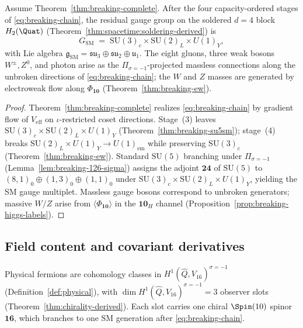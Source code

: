 \begin{proposition}
\label{prop:sm-gauge-content}
Assume Theorem~\ref{thm:breaking-complete}. After the four capacity-ordered
stages of \eqref{eq:breaking-chain}, the residual gauge group on the
soldered $d=4$ block $H_2(\Quat)$ (Theorem~\ref{thm:spacetime:soldering-derived})
is
\begin{equation}\label{eq:sm-gauge-group}
  G_{\mathrm{SM}}
  \;=\;
  \mathrm{SU}(3)_c\times\mathrm{SU}(2)_L\times U(1)_Y,
\end{equation}
with Lie algebra $\mathfrak{g}_{\mathrm{SM}}=\mathfrak{su}_3\oplus\mathfrak{su}_2
\oplus\mathfrak{u}_1$. The eight gluons, three weak bosons
$W^\pm,Z^0$, and photon arise as the $\Pi_{\sigma=-1}$-projected massless
connections along the unbroken directions of \eqref{eq:breaking-chain}; the
$W$ and $Z$ masses are generated by electroweak flow along $\Phi_{\mathbf{10}}$
(Theorem~\ref{thm:breaking-ew}).
\end{proposition}

\begin{proof}
Theorem~\ref{thm:breaking-complete} realizes
\eqref{eq:breaking-chain} by gradient flow of $V_{\mathrm{eff}}$ on
$\iota$-restricted coset directions. Stage~(3) leaves
$\mathrm{SU}(3)_c\times\mathrm{SU}(2)_L\times U(1)_Y$
(Theorem~\ref{thm:breaking-su5sm}); stage~(4) breaks
$\mathrm{SU}(2)_L\times U(1)_Y\to U(1)_{\mathrm{em}}$ while preserving
$\mathrm{SU}(3)_c$ (Theorem~\ref{thm:breaking-ew}). Standard $\mathrm{SU}(5)$
branching under $\Pi_{\sigma=-1}$ (Lemma~\ref{lem:breaking-126-sigma})
assigns the adjoint $\mathbf{24}$ of $\mathrm{SU}(5)$ to
$(8,1)_0\oplus(1,3)_0\oplus(1,1)_0$ under
$\mathrm{SU}(3)_c\times\mathrm{SU}(2)_L\times U(1)_Y$, yielding the SM gauge
multiplet. Massless gauge bosons correspond to unbroken generators; massive
$W/Z$ arise from $\langle\Phi_{\mathbf{10}}\rangle$ in the $\mathbf{10}_H$
channel (Proposition~\ref{prop:breaking-higgs-labels}).
\end{proof}

\subsection{Field content and covariant derivatives}
\label{sec:sm-lagrangian:fields}

Physical fermions are cohomology classes in
$H^1(\hat Q,V_{16})^{\sigma=-1}$ (Definition~\ref{def:physical}), with
$\dim H^1(\hat Q,V_{16})^{\sigma=-1}=3$ observer slots
(Theorem~\ref{thm:chirality-derived}). Each slot carries one chiral
$\Spin(10)$ spinor $\mathbf{16}$, which branches to one SM generation after
\eqref{eq:breaking-chain}.


